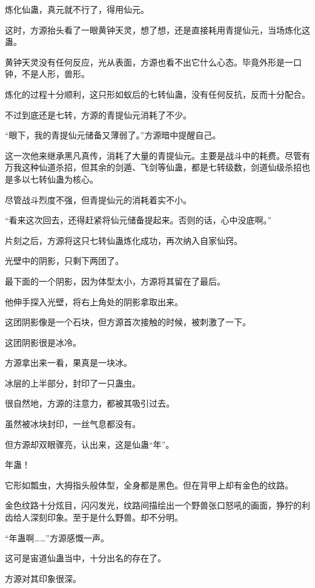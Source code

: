 
\begin{this_body}

炼化仙蛊，真元就不行了，得用仙元。

这时，方源抬头看了一眼黄钟天灵，想了想，还是直接耗用青提仙元，当场炼化这蛊。

黄钟天灵没有任何反应，光从表面，方源也看不出它什么心态。毕竟外形是一口钟，不是人形，兽形。

炼化的过程十分顺利，这只形如蚁后的七转仙蛊，没有任何反抗，反而十分配合。

不过到底还是七转，方源的青提仙元消耗了不少。

“眼下，我的青提仙元储备又薄弱了。”方源暗中提醒自己。

这一次他来继承黑凡真传，消耗了大量的青提仙元。主要是战斗中的耗费。尽管有万我这种仙道杀招，但其余的剑遁、飞剑等仙蛊，都是七转级数，剑道仙级杀招也是多以七转仙蛊为核心。

尽管战斗烈度不强，但青提仙元的消耗着实不小。

“看来这次回去，还得赶紧将仙元储备提起来。否则的话，心中没底啊。”

片刻之后，方源将这只七转仙蛊炼化成功，再次纳入自家仙窍。

光壁中的阴影，只剩下两团了。

最下面的一个阴影，因为体型太小，方源将其留在了最后。

他伸手探入光壁，将右上角处的阴影拿取出来。

这团阴影像是一个石块，但方源首次接触的时候，被刺激了一下。

这团阴影很是冰冷。

方源拿出来一看，果真是一块冰。

冰层的上半部分，封印了一只蛊虫。

很自然地，方源的注意力，都被其吸引过去。

虽然被冰块封印，一丝气息都没有。

但方源却双眼骤亮，认出来，这是仙蛊“年”。

年蛊！

它形如瓢虫，大拇指头般体型，全身都是黑色。但在背甲上却有金色的纹路。

金色纹路十分炫目，闪闪发光，纹路间描绘出一个野兽张口怒吼的画面，狰狞的利齿给人深刻印象。至于是什么野兽。却不分明。

“年蛊啊……”方源感慨一声。

这可是宙道仙蛊当中，十分出名的存在了。

方源对其印象很深。


\end{this_body}
